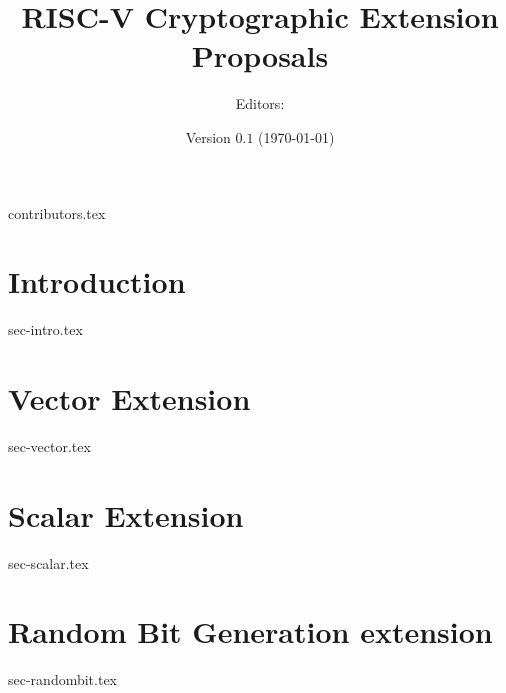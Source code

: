 \documentclass[11pt]{article}
\title{RISC-V Cryptographic Extension Proposals}
\author{Editors: }
\date{Version $0.1$ (\today)}
\begin{document}

\maketitle

{contributors.tex}

\tableofcontents


\newpage
\section{Introduction}
\label{sec:intro}
{sec-intro.tex}

\newpage
\section{Vector Extension}
\label{sec:vector}
{sec-vector.tex}

\newpage
\section{Scalar Extension}
\label{sec:scalar}
{sec-scalar.tex}

\newpage
\section{Random Bit Generation extension}
\label{sec:randombit}
{sec-randombit.tex}



\appendix

%
%


\printbibliography
\end{document}
